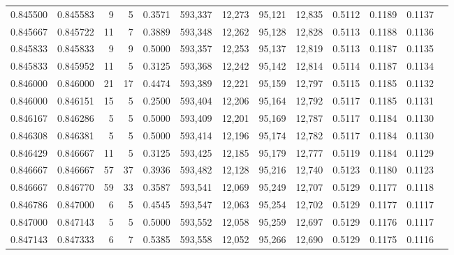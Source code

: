 \begin{tabular}{rrrrrrrrrrrrr}
0.845500 & 0.845583 &     9 &   5 &                                     0.3571 & 593,337 &  12,273 &  95,121 &  12,835 & 0.5112 & 0.1189 & 0.1137 \\
0.845667 & 0.845722 &    11 &   7 &                                     0.3889 & 593,348 &  12,262 &  95,128 &  12,828 & 0.5113 & 0.1188 & 0.1136 \\
0.845833 & 0.845833 &     9 &   9 &                                     0.5000 & 593,357 &  12,253 &  95,137 &  12,819 & 0.5113 & 0.1187 & 0.1135 \\
0.845833 & 0.845952 &    11 &   5 &                                     0.3125 & 593,368 &  12,242 &  95,142 &  12,814 & 0.5114 & 0.1187 & 0.1134 \\
0.846000 & 0.846000 &    21 &  17 &                                     0.4474 & 593,389 &  12,221 &  95,159 &  12,797 & 0.5115 & 0.1185 & 0.1132 \\
0.846000 & 0.846151 &    15 &   5 &                                     0.2500 & 593,404 &  12,206 &  95,164 &  12,792 & 0.5117 & 0.1185 & 0.1131 \\
0.846167 & 0.846286 &     5 &   5 &                                     0.5000 & 593,409 &  12,201 &  95,169 &  12,787 & 0.5117 & 0.1184 & 0.1130 \\
0.846308 & 0.846381 &     5 &   5 &                                     0.5000 & 593,414 &  12,196 &  95,174 &  12,782 & 0.5117 & 0.1184 & 0.1130 \\
0.846429 & 0.846667 &    11 &   5 &                                     0.3125 & 593,425 &  12,185 &  95,179 &  12,777 & 0.5119 & 0.1184 & 0.1129 \\
0.846667 & 0.846667 &    57 &  37 &                                     0.3936 & 593,482 &  12,128 &  95,216 &  12,740 & 0.5123 & 0.1180 & 0.1123 \\
0.846667 & 0.846770 &    59 &  33 &                                     0.3587 & 593,541 &  12,069 &  95,249 &  12,707 & 0.5129 & 0.1177 & 0.1118 \\
0.846786 & 0.847000 &     6 &   5 &                                     0.4545 & 593,547 &  12,063 &  95,254 &  12,702 & 0.5129 & 0.1177 & 0.1117 \\
0.847000 & 0.847143 &     5 &   5 &                                     0.5000 & 593,552 &  12,058 &  95,259 &  12,697 & 0.5129 & 0.1176 & 0.1117 \\
0.847143 & 0.847333 &     6 &   7 &                                     0.5385 & 593,558 &  12,052 &  95,266 &  12,690 & 0.5129 & 0.1175 & 0.1116 \\

\end{tabular}
